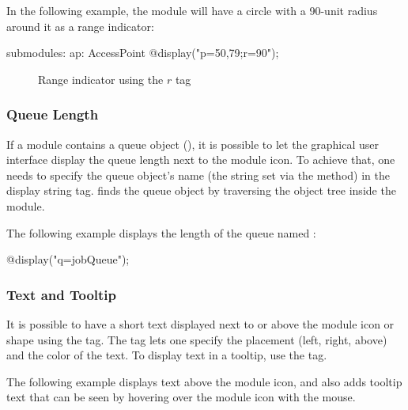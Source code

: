 In the following example, the module will have a circle with a 90-unit radius
around it as a range indicator:

\begin{ned}
submodules:
    ap: AccessPoint {
        @display("p=50,79;r=90");
    }
\end{ned}

\begin{figure}[htbp]
  \begin{center}
    \caption{Range indicator using the $r$ tag}
    \label{fig:graphics-rtag}
  \end{center}
\end{figure}

\subsubsection{Queue Length}
\label{sec:graphics:submodule-queue-length}

If a module contains a queue object (), it is possible to
let the graphical user interface display the queue length next to the
module icon. To achieve that, one needs to specify the queue object's name
(the string set via the  method) in the  display string tag.
{\opp} finds the queue object by traversing the object tree inside
the module.

The following example displays the length of the queue named :

\begin{ned}
@display("q=jobQueue");
\end{ned}

\begin{center}
\end{center}

\subsubsection{Text and Tooltip}
\label{sec:graphics:submdule-text-and-tooltip}

It is possible to have a short text displayed next to or above the module icon
or shape using the  tag. The tag lets one specify the placement (left,
right, above) and the color of the text. To display text in a tooltip, use
the  tag.

The following example displays text above the module icon, and also adds
tooltip text that can be seen by hovering over the module icon with the
mouse.

